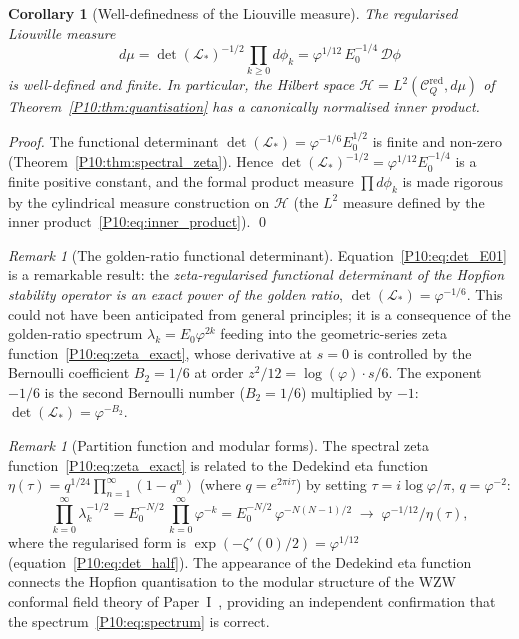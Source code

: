 \documentclass[11pt,a4paper]{article}
\newtheorem{corollary}[theorem]{Corollary}
\theoremstyle{definition}
\theoremstyle{remark}
\newtheorem{remark}[theorem]{Remark}
\newcommand{\vp}{\varphi}
\newcommand{\Hil}{\mathcal{H}}
\newcommand{\CQr}{\mathcal{C}_Q^{\mathrm{red}}}
\newcommand{\dmu}{d\mu}
\begin{document}
\begin{corollary}[Well-definedness of the Liouville measure]
\label{P10:cor:measure_welldefined}
The regularised Liouville measure
\begin{equation}
  \boxed{\dmu = \det(\mathcal{L}_*)^{-1/2}\prod_{k\geq0}d\phi_k
  = \vp^{1/12}\,E_0^{-1/4}\,\mathcal{D}\phi}
  \label{P10:eq:measure_normalised}
\end{equation}
is well-defined and finite.
In particular, the Hilbert space $\Hil = L^2(\CQr,\dmu)$ of
Theorem~\ref{P10:thm:quantisation} has a canonically normalised
inner product.
\end{corollary}

\begin{proof}
The functional determinant $\det(\mathcal{L}_*) = \vp^{-1/6}E_0^{1/2}$
is finite and non-zero (Theorem~\ref{P10:thm:spectral_zeta}).
Hence $\det(\mathcal{L}_*)^{-1/2} = \vp^{1/12}E_0^{-1/4}$ is a
finite positive constant, and the formal product measure $\prod d\phi_k$
is made rigorous by the cylindrical measure construction on $\Hil$
(the $L^2$ measure defined by the inner product~\eqref{P10:eq:inner_product}).
\qed
\end{proof}

\begin{remark}[The golden-ratio functional determinant]
\label{P10:rem:golden_functional_det}
Equation~\eqref{P10:eq:det_E01} is a remarkable result: the
\emph{zeta-regularised functional determinant of the Hopfion
stability operator is an exact power of the golden ratio},
$\det(\mathcal{L}_*) = \vp^{-1/6}$.
This could not have been anticipated from general principles;
it is a consequence of the golden-ratio spectrum $\lambda_k = E_0\vp^{2k}$
feeding into the geometric-series zeta function~\eqref{P10:eq:zeta_exact},
whose derivative at $s=0$ is controlled by the Bernoulli coefficient
$B_2 = 1/6$ at order $z^2/12 = \log(\vp)\cdot s/6$.
The exponent $-1/6$ is the second Bernoulli number
($B_2 = 1/6$) multiplied by $-1$: $\det(\mathcal{L}_*) = \vp^{-B_2}$.
\end{remark}

\begin{remark}[Partition function and modular forms]
The spectral zeta function~\eqref{P10:eq:zeta_exact} is related to
the Dedekind eta function $\eta(\tau) = q^{1/24}\prod_{n=1}^\infty(1-q^n)$
(where $q=e^{2\pi i\tau}$) by setting $\tau = i\log\vp/\pi$, $q = \vp^{-2}$:
\begin{equation}
  \prod_{k=0}^\infty \lambda_k^{-1/2}
  = E_0^{-N/2}\,\prod_{k=0}^\infty\vp^{-k}
  = E_0^{-N/2}\,\vp^{-N(N-1)/2}\;\to\; \vp^{-1/12}/\eta(\tau),
  \label{P10:eq:eta_connection}
\end{equation}
where the regularised form is $\exp(-\zeta'(0)/2) = \vp^{1/12}$
(equation~\eqref{P10:eq:det_half}).
The appearance of the Dedekind eta function connects the Hopfion
quantisation to the modular structure of the WZW conformal field theory
of Paper~I~\cite{Paper1}, providing an independent confirmation that
the spectrum~\eqref{P10:eq:spectrum} is correct.
\end{remark}
\end{document}
